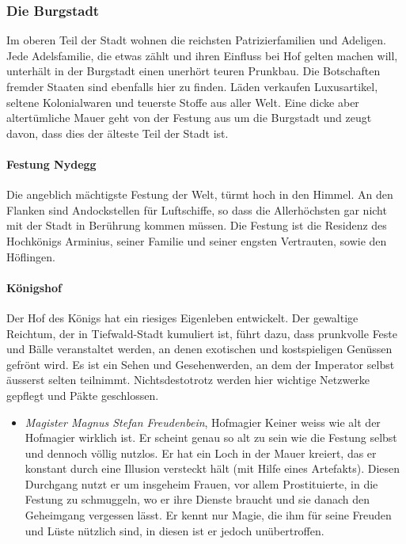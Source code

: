 \documentclass[10pt,twoside,twocolumn,openany]{book}
\begin{document}
\begin{multicols}{2}
	\subsubsection{Die Burgstadt}
	Im oberen Teil der Stadt wohnen die reichsten Patrizierfamilien und Adeligen. Jede Adelsfamilie, die etwas zählt und ihren Einfluss bei Hof gelten machen will, unterhält in der Burgstadt einen unerhört teuren Prunkbau. Die Botschaften fremder Staaten sind ebenfalls hier zu finden. Läden verkaufen Luxusartikel, seltene Kolonialwaren und teuerste Stoffe aus aller Welt. Eine dicke aber altertümliche Mauer geht von der Festung aus um die Burgstadt und zeugt davon, dass dies der älteste Teil der Stadt ist.
	
	\paragraph{Festung Nydegg} Die angeblich mächtigste Festung der Welt, türmt hoch in den Himmel. An den Flanken sind Andockstellen für Luftschiffe, so dass die Allerhöchsten gar nicht mit der Stadt in Berührung kommen müssen. Die Festung ist die Residenz des Hochkönigs Arminius, seiner Familie und seiner engsten Vertrauten, sowie den Höflingen.
	
	\paragraph{Königshof} Der Hof des Königs hat ein riesiges Eigenleben entwickelt. Der gewaltige Reichtum, der in Tiefwald-Stadt kumuliert ist, führt dazu, dass prunkvolle Feste und Bälle veranstaltet werden, an denen exotischen und kostspieligen Genüssen gefrönt wird. Es ist ein Sehen und Gesehenwerden, an dem der Imperator selbst äusserst selten teilnimmt. Nichtsdestotrotz werden hier wichtige Netzwerke gepflegt und Päkte geschlossen.
	\begin{itemize}
		\item\textit{ Magister Magnus Stefan Freudenbein}, Hofmagier
		Keiner weiss wie alt der Hofmagier wirklich ist. Er scheint genau so alt zu sein wie die Festung selbst und dennoch völlig nutzlos. Er hat ein Loch in der Mauer kreiert, das er konstant durch eine Illusion versteckt hält (mit Hilfe eines Artefakts). Diesen Durchgang nutzt er um insgeheim Frauen, vor allem Prostituierte, in die Festung zu schmuggeln, wo er ihre Dienste braucht und sie danach den Geheimgang vergessen lässt. Er kennt nur Magie, die ihm für seine Freuden und Lüste nützlich sind, in diesen ist er jedoch unübertroffen.
	\end{itemize}


\end{multicols}
\end{document}
